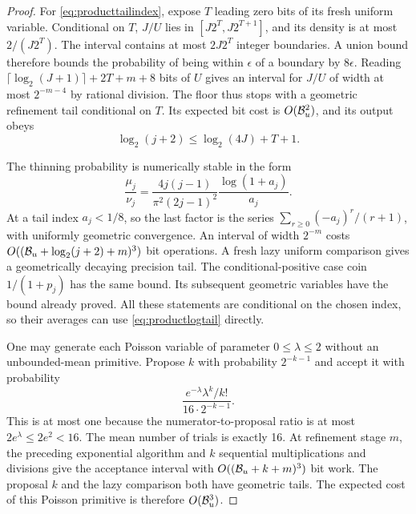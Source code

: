 \begin{proof}
For \eqref{eq:producttailindex}, expose $T$ leading zero bits
of its fresh uniform variable. Conditional on $T$,
$J/U$ lies in $[J2^T,J2^{T+1}]$, and its density is at most
$2/(J2^T)$. The interval contains at most $2J2^T$ integer
boundaries. A union bound therefore bounds the probability of
being within $\epsilon$ of a boundary by $8\epsilon$.
Reading
$\lceil\log_2(J+1)\rceil+2T+m+8$ bits of $U$ gives an
interval for $J/U$ of width at most $2^{-m-4}$ by rational
division. The floor thus stops with a geometric refinement
tail conditional on $T$. Its expected bit cost is
$O(\mathcal B_u^2)$, and its output obeys
\begin{equation}\label{eq:productlogtail}
 \log_2(j+2)\le\log_2(4J)+T+1.
\end{equation}

The thinning probability is numerically stable in the form
\[
 \frac{\mu_j}{\nu_j}
 =\frac{4j(j-1)}{\pi^2(2j-1)^2}
   \frac{\log(1+a_j)}{a_j}.
\]
At a tail index $a_j<1/8$, so the last factor is the series
$\sum_{r\ge0}(-a_j)^r/(r+1)$, with uniformly geometric
convergence. An interval of width $2^{-m}$ costs
$O((\mathcal B_u+\log_2(j+2)+m)^3)$ bit operations.
A fresh lazy uniform comparison gives a geometrically decaying
precision tail. The conditional-positive case coin
$1/(1+p_j)$ has the same bound. Its subsequent geometric
variables have the bound already proved. All these statements
are conditional on the chosen index, so their averages can
use \eqref{eq:productlogtail} directly.

One may generate each Poisson variable of parameter
$0\le\lambda\le2$ without an unbounded-mean primitive.
Propose $k$ with probability $2^{-k-1}$ and accept it with
probability
\[
 \frac{e^{-\lambda}\lambda^k/k!}{16\cdot2^{-k-1}}.
\]
This is at most one because the numerator-to-proposal ratio is
at most $2e^\lambda\le2e^2<16$.
The mean number of trials is exactly 16.
At refinement stage $m$, the preceding exponential algorithm
and $k$ sequential multiplications and divisions give the
acceptance interval with $O((\mathcal B_u+k+m)^3)$ bit work.
The proposal $k$ and the lazy comparison both have geometric
tails. The expected cost of this Poisson primitive is therefore
$O(\mathcal B_u^3)$.


\end{proof}
